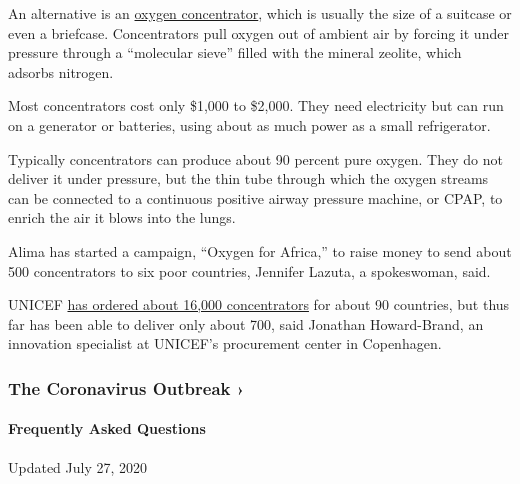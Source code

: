 An alternative is an
\href{https://en.wikipedia.org/wiki/Oxygen_concentrator}{oxygen
concentrator}, which is usually the size of a suitcase or even a
briefcase. Concentrators pull oxygen out of ambient air by forcing it
under pressure through a ``molecular sieve'' filled with the mineral
zeolite, which adsorbs nitrogen.

Most concentrators cost only \$1,000 to \$2,000. They need electricity
but can run on a generator or batteries, using about as much power as a
small refrigerator.

Typically concentrators can produce about 90 percent pure oxygen. They
do not deliver it under pressure, but the thin tube through which the
oxygen streams can be connected to a continuous positive airway pressure
machine, or CPAP, to enrich the air it blows into the lungs.

Alima has started a campaign, ``Oxygen for Africa,'' to raise money to
send about 500 concentrators to six poor countries, Jennifer Lazuta, a
spokeswoman, said.

UNICEF \href{https://www.unicef.org/innovation/oxygen-therapy}{has
ordered about 16,000 concentrators} for about 90 countries, but thus far
has been able to deliver only about 700, said Jonathan Howard-Brand, an
innovation specialist at UNICEF's procurement center in Copenhagen.

\href{https://www.nytimes3xbfgragh.onion/news-event/coronavirus?action=click\&pgtype=Article\&state=default\&region=MAIN_CONTENT_3\&context=storylines_faq}{}

\hypertarget{the-coronavirus-outbreak-}{%
\subsubsection{The Coronavirus Outbreak
›}\label{the-coronavirus-outbreak-}}

\hypertarget{frequently-asked-questions}{%
\paragraph{Frequently Asked
Questions}\label{frequently-asked-questions}}

Updated July 27, 2020

